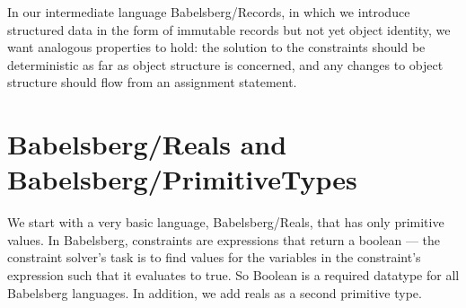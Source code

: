 \documentclass{article}
\begin{document}
In our intermediate language Babelsberg/Records, in which we introduce
structured data in the form of immutable records but not yet object
identity, we want analogous properties to hold: the solution to the
constraints should be deterministic as far as object structure is
concerned, and any changes to object structure should flow from an
assignment statement.



\section{Babelsberg/Reals and Babelsberg/PrimitiveTypes}
\label{sec:babelsberg-primitivetypes}

We start with a very basic language, Babelsberg/Reals, that has only
primitive values. In Babelsberg, constraints are expressions that
return a boolean --- the constraint solver's task is to find values for
the variables in the constraint's expression such that it
evaluates to true. So Boolean is a required datatype for
all Babelsberg languages. In addition, we add reals as a second
primitive type.
\end{document}
